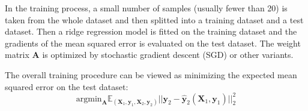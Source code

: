 \documentclass[a4paper,11pt]{article}
\begin{document}
In the training process, a small number of samples (usually fewer than 20) is taken from the whole dataset and then splitted into a training dataset and a test dataset.
Then a ridge regression model is fitted on the training dataset and the gradients of the mean squared error is evaluated on the test dataset.
The weight matrix $\mathbf{A}$ is optimized by stochastic gradient descent (SGD) or other variants.

The overall training procedure can be viewed as minimizing the expected mean squared error on the test dataset:
\begin{equation}
\text{argmin}_{\mathbf{A}} \mathbb{E}_{(\mathbf{X}_1, \mathbf{y}_1, \mathbf{X}_2, \mathbf{y}_2)} || \mathbf{y}_2 - \hat{\mathbf{y}}_2(\mathbf{X}_1, \mathbf{y}_1) ||_2^2
\end{equation}
\end{document}
